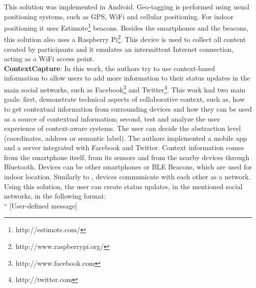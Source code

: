 This solution was implemented in Android.
Geo-tagging is performed using usual positioning
systems, such as GPS, WiFi and cellular positioning.
For indoor positioning it uses
Estimote\footnote{http://estimote.com/} beacons.
Besides the smartphones and the beacons, this
solution also uses a
Raspberry Pi\footnote{http://www.raspberrypi.org/}.
This device is used to collect all content created by
participants and it emulates an intermittent Internet
connection, acting as a WiFi access point.
\\
\textbf{ContextCapture}\cite{Antila2011}:
In this work, the authors try to use
context-based information to allow users to
add more information to their status updates
in the main social networks, such as
Facebook\footnote{http://www.facebook.com} and
Twitter\footnote{http://twitter.com}.
This work had two main goals: first, demonstrate technical
aspects of collaborative context, such as,
how to get contextual information from
surrounding devices and how they can be used
as a source of contextual information;
second, test and analyze the user experience of
context-aware systems.
The user can decide the abstraction level (coordinates,
address or semantic label).
The authors implemented a mobile app and a
server integrated with Facebook and Twitter.
Context information comes from the smartphone itself,
from its sensors and from the nearby devices through
Bluetooth.
Devices can be other smartphones or BLE Beacons, which
are used for indoor location.
Similarly to \cite{BenAbdesslem2014}, devices communicate
with each other as a network.
Using this solution, the user can create status updates,
in the mentioned social networks, in the following format:
\\
``
[User-defined message]

